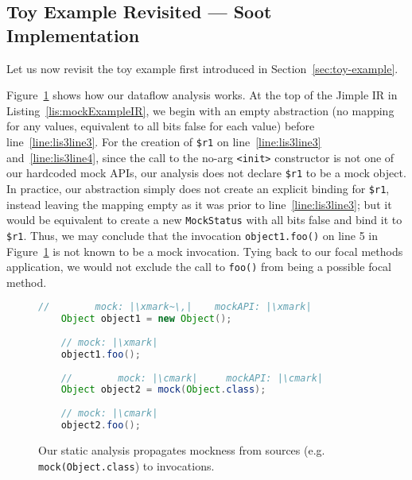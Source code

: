 

\subsection{Toy Example Revisited --- Soot Implementation}
\label{subsec:toy-example-soot}

Let us now revisit the toy example first introduced in Section~\ref{sec:toy-example}. 

Figure~\ref{fig:mockExample} shows how our dataflow analysis works. At the top of the Jimple IR in Listing~\ref{lis:mockExampleIR}, we begin with an empty abstraction (no mapping for any values, equivalent to all bits false for each value) before line~\ref{line:lis3line3}. For the creation of \texttt{\$r1} on line~\ref{line:lis3line3} and~\ref{line:lis3line4}, since the call to the no-arg \texttt{<init>} constructor is not one of our hardcoded mock APIs, our analysis does not declare \texttt{\$r1} to be a mock object. In practice, our abstraction simply does not create an explicit binding for \texttt{\$r1}, instead leaving the mapping empty as it was prior to line~\ref{line:lis3line3}; but it would be equivalent to create a new \texttt{MockStatus} with all bits false and bind it to \texttt{\$r1}. Thus, we may conclude that the invocation \texttt{object1.foo()} on line 5 in Figure~\ref{fig:mockExample} is not known to be a mock invocation. Tying back to our focal methods application, we would not exclude the call to \texttt{foo()} from being a possible focal method.

\begin{figure}
	\begin{lstlisting}[basicstyle=\ttfamily,
	basicstyle=\ttfamily,language = Java, framesep=4.5mm, framexleftmargin=1.0mm, captionpos=b, escapechar=|, morekeywords={@Test}]
	//        mock: |\xmark~\,|    mockAPI: |\xmark|
	Object object1 = new Object();
	
	// mock: |\xmark|
	object1.foo();
	
	//        mock: |\cmark|     mockAPI: |\cmark|
	Object object2 = mock(Object.class);
	
	// mock: |\cmark|
	object2.foo();
	\end{lstlisting}
	
	\caption{Our static analysis propagates mockness from sources (e.g. \texttt{mock(Object.class}) to invocations.}
	\label{fig:mockExample}
	
\end{figure}

